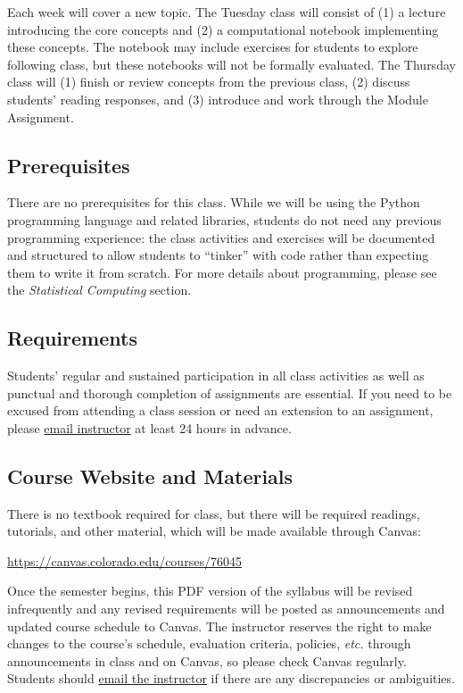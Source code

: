 \documentclass[11pt]{memoir}
\begin{document}
Each week will cover a new topic. The Tuesday class will consist of (1) a lecture introducing the core concepts and (2) a computational notebook implementing these concepts. The notebook may include exercises for students to explore following class, but these notebooks will not be formally evaluated. The Thursday class will (1) finish or review concepts from the previous class, (2) discuss students' reading responses, and (3) introduce and work through the Module Assignment.


\subsection{Prerequisites}
There are no prerequisites for this class. While we will be using the Python programming language and related libraries, students do not need any previous programming experience: the class activities and exercises will be documented and structured to allow students to ``tinker'' with code rather than expecting them to write it from scratch. For more details about programming, please see the \textit{Statistical Computing} section.

\subsection{Requirements}
Students' regular and sustained participation in all class activities as well as punctual and thorough completion of assignments are essential. If you need to be excused from attending a class session or need an extension to an assignment, please \href{mailto:brian.keegan@colorado.edu}{email instructor} at least 24 hours in advance.

\subsection{Course Website and Materials}
There is no textbook required for class, but there will be required readings, tutorials, and other material, which will be made available through Canvas:
\begin{center}
    \Large{\href{https://canvas.colorado.edu/courses/76045}{https://canvas.colorado.edu/courses/76045}}
\end{center}
Once the semester begins, this PDF version of the syllabus will be revised infrequently and any revised requirements will be posted as announcements and updated course schedule to Canvas. The instructor reserves the right to make changes to the course's schedule, evaluation criteria, policies, \textit{etc.} through announcements in class and on Canvas, so please check Canvas regularly. Students should \href{mailto:brian.keegan@colorado.edu}{email the instructor} if there are any discrepancies or ambiguities.
\end{document}
